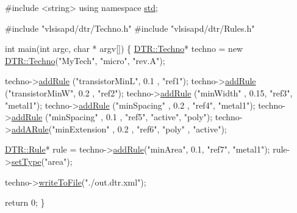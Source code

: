 \begin{DoxyCodeInclude}
\textcolor{preprocessor}{#include <string>}
\textcolor{keyword}{using namespace }\hyperlink{namespacestd}{std};

\textcolor{preprocessor}{#include "vlsisapd/dtr/Techno.h"}
\textcolor{preprocessor}{#include "vlsisapd/dtr/Rules.h"}

\textcolor{keywordtype}{int} main(\textcolor{keywordtype}{int} argc, \textcolor{keywordtype}{char} * argv[]) \{
    \hyperlink{class_d_t_r_1_1_techno}{DTR::Techno}* techno = \textcolor{keyword}{new} \hyperlink{class_d_t_r_1_1_techno}{DTR::Techno}(\textcolor{stringliteral}{"MyTech"}, \textcolor{stringliteral}{"micro"}, \textcolor{stringliteral}{"rev.A"});

    techno->\hyperlink{class_d_t_r_1_1_techno_afa2c8412c365c950649b9f81661ecafd}{addRule} (\textcolor{stringliteral}{"transistorMinL"}, 0.1 , \textcolor{stringliteral}{"ref1"});
    techno->\hyperlink{class_d_t_r_1_1_techno_afa2c8412c365c950649b9f81661ecafd}{addRule} (\textcolor{stringliteral}{"transistorMinW"}, 0.2 , \textcolor{stringliteral}{"ref2"});
    techno->\hyperlink{class_d_t_r_1_1_techno_afa2c8412c365c950649b9f81661ecafd}{addRule} (\textcolor{stringliteral}{"minWidth"}      , 0.15, \textcolor{stringliteral}{"ref3"}, \textcolor{stringliteral}{"metal1"});
    techno->\hyperlink{class_d_t_r_1_1_techno_afa2c8412c365c950649b9f81661ecafd}{addRule} (\textcolor{stringliteral}{"minSpacing"}    , 0.2 , \textcolor{stringliteral}{"ref4"}, \textcolor{stringliteral}{"metal1"});
    techno->\hyperlink{class_d_t_r_1_1_techno_afa2c8412c365c950649b9f81661ecafd}{addRule} (\textcolor{stringliteral}{"minSpacing"}    , 0.1 , \textcolor{stringliteral}{"ref5"}, \textcolor{stringliteral}{"active"}, \textcolor{stringliteral}{"poly"});
    techno->\hyperlink{class_d_t_r_1_1_techno_a5f5a790974fe7d3b1c6f1b698ef0a818}{addARule}(\textcolor{stringliteral}{"minExtension"}  , 0.2 , \textcolor{stringliteral}{"ref6"}, \textcolor{stringliteral}{"poly"}  , \textcolor{stringliteral}{"active"});
    
    \hyperlink{class_d_t_r_1_1_rule}{DTR::Rule}* rule = techno->\hyperlink{class_d_t_r_1_1_techno_afa2c8412c365c950649b9f81661ecafd}{addRule}(\textcolor{stringliteral}{"minArea"}, 0.1, \textcolor{stringliteral}{"ref7"}, \textcolor{stringliteral}{"metal1"});
    rule->\hyperlink{class_d_t_r_1_1_rule_a3568407d7a7890c39b8c9acc1e608535}{setType}(\textcolor{stringliteral}{"area"});

    techno->\hyperlink{class_d_t_r_1_1_techno_a26b05539dd3345963b8708788b82e2cb}{writeToFile}(\textcolor{stringliteral}{"./out.dtr.xml"});
    
    \textcolor{keywordflow}{return} 0;
\}

\end{DoxyCodeInclude}


